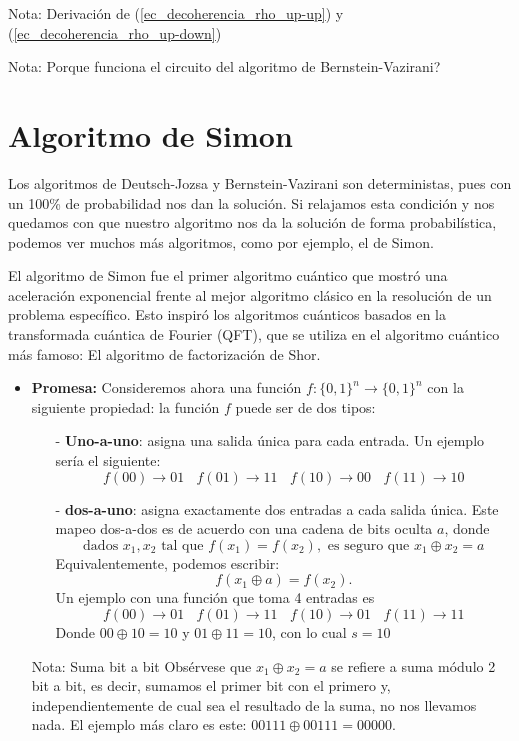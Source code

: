 \documentclass[a4paper,11pt]{book} %
\numberwithin{equation}{chapter}
\begin{document}
\begin{mybox_blue}{Nota: Derivación de (\ref{ec_decoherencia_rho_up-up}) y  (\ref{ec_decoherencia_rho_up-down})}
\begin{mybox_blue}{Nota: Porque funciona el circuito del algoritmo de Bernstein-Vazirani?}
	
	\end{mybox_blue}


	\section{Algoritmo de Simon}

Los algoritmos de Deutsch-Jozsa y Bernstein-Vazirani son deterministas, pues con un 100\% de probabilidad nos dan la solución. Si relajamos esta condición y nos quedamos con que nuestro algoritmo nos da la solución de forma probabilística, podemos ver muchos más algoritmos, como por ejemplo, el de Simon.

El algoritmo de Simon fue el primer algoritmo cuántico que mostró una aceleración exponencial frente al mejor algoritmo clásico en la resolución de un problema específico. Esto inspiró los algoritmos cuánticos basados en la transformada cuántica de Fourier (QFT), que se utiliza en el algoritmo cuántico más famoso: El algoritmo de factorización de Shor.


\begin{itemize}
	\item \textbf{Promesa:} Consideremos ahora una función $f:\{0,1\}^n \to \{0,1\}^n$ con la siguiente propiedad: la función $f$ puede ser de dos tipos:
	\begin{itemize}
		\item[-] \textbf{Uno-a-uno}: asigna una salida única para cada entrada. Un ejemplo sería el siguiente:
		$$
		f(00) \rightarrow 01 ~~~~
		f(01) \rightarrow 11 ~~~~
		f(10) \rightarrow 00 ~~~~
		f(11) \rightarrow 10 
		$$
		\item[-] \textbf{dos-a-uno}: asigna exactamente dos entradas a cada salida única. Este mapeo dos-a-dos es de acuerdo con una cadena de bits oculta $a$, donde
		$$
		\text{dados } x_1, x_2 \text{ tal que } f(x_1) = f(x_2), \text{ es seguro que } x_1 \oplus x_2 = a
		$$
		Equivalentemente, podemos escribir: 
		$$ 
		f(x_1 \oplus a ) = f(x_2).
		$$
		Un ejemplo con una función que toma 4 entradas es
		$$
		f(00) \rightarrow 01 ~~~~
		f(01) \rightarrow 11 ~~~~
		f(10) \rightarrow 01 ~~~~
		f(11) \rightarrow 11 
		$$
		Donde $00 \oplus 10 =  10$ y $01 \oplus 11 = 10$, con lo cual $s =10$
	\end{itemize}
	
	\begin{mybox_blue}{Nota: Suma bit a bit}
	Obsérvese que $x_1 \oplus x_2 = a$ se refiere a suma módulo 2 bit a bit, es decir, sumamos el primer bit con el primero y, independientemente de cual sea el resultado de la suma, no nos llevamos nada. El ejemplo más claro es este: $00111 \oplus 00111 = 00000$.
	\end{mybox_blue}
	

\end{itemize}
\end{mybox_blue}
\end{document}
